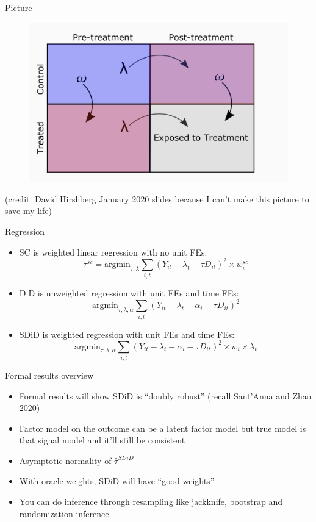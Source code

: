 \documentclass{beamer}
\begin{document}
\begin{frame}{Picture}

	\begin{figure}
	\includegraphics[scale=0.3]{./lecture_includes/hirshberg_sdid_1.png}
	\end{figure}

(credit: David Hirshberg January 2020 slides because I can't make this picture to save my life)

\end{frame}

\begin{frame}{Regression}

\begin{itemize}
\item SC is weighted linear regression with no unit FEs:$$\tau^{sc} = \textrm{argmin}_{\tau, \lambda}  \sum_{i,t} (Y_{it} - \lambda_t - \tau D_{it})^2 \times w_i^{sc} $$
\item DiD is unweighted regression with unit FEs and time FEs:$$\textrm{argmin}_{\tau, \lambda, \alpha}  \sum_{i,t} (Y_{it} - \lambda_t - \alpha_i -  \tau D_{it})^2 $$
\item SDiD is weighted regression with unit FEs and time FEs:$$ \textrm{argmin}_{\tau, \lambda, \alpha} \sum_{i,t} (Y_{it} - \lambda_t - \alpha_i - \tau D_{it})^2 \times w_i \times \lambda_t$$
\end{itemize}

\end{frame}

\begin{frame}{Formal results overview}

\begin{itemize}
\item Formal results will show SDiD is ``doubly robust'' (recall Sant'Anna and Zhao 2020)
\item Factor model  on the outcome can be a latent factor model but true model is that signal model and it'll still be consistent
\item Asymptotic normality of $\widehat{\tau}^{SDiD}$
\item With oracle weights, SDiD will have ``good weights''
\item You can do inference through resampling like jackknife, bootstrap and randomization inference
\end{itemize}

\end{frame}
\end{document}
